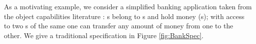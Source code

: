 

As a motivating example, we consider a simplified banking application 
taken from the object capabilities literature \cite{ELang}:
 s belong to s and hold money (s);  
with access  to two s of the same   one can  transfer any amount of money from
 one to the other.  We give a traditional specification in Figure \ref{fig:BankSpec}.

%
%

